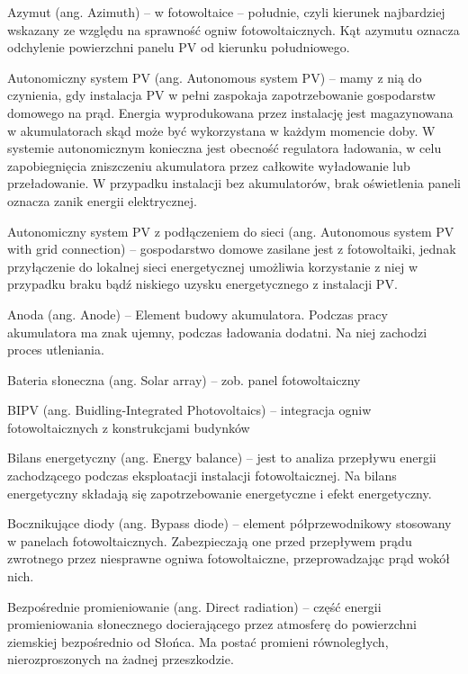 \documentclass[12pt,a4paper]{article}
\begin{document}
Azymut (ang. Azimuth) – w fotowoltaice – południe, czyli kierunek najbardziej wskazany ze względu na sprawność ogniw fotowoltaicznych. Kąt azymutu oznacza odchylenie powierzchni panelu PV od kierunku południowego.

Autonomiczny system PV (ang. Autonomous system PV) – mamy z nią do czynienia, gdy instalacja PV w pełni zaspokaja zapotrzebowanie gospodarstw domowego na prąd. Energia wyprodukowana przez instalację jest magazynowana w akumulatorach skąd może być wykorzystana w każdym momencie doby. W systemie autonomicznym konieczna jest obecność regulatora ładowania, w celu zapobiegnięcia zniszczeniu akumulatora przez całkowite wyładowanie lub przeładowanie. W przypadku instalacji bez akumulatorów, brak oświetlenia paneli oznacza zanik energii elektrycznej.

Autonomiczny system PV z podłączeniem do sieci (ang. Autonomous system PV with grid connection) – gospodarstwo domowe zasilane jest z fotowoltaiki, jednak przyłączenie do lokalnej sieci energetycznej umożliwia korzystanie z niej w przypadku braku bądź niskiego uzysku energetycznego z instalacji PV.

Anoda (ang. Anode) – Element budowy akumulatora. Podczas pracy akumulatora ma znak ujemny, podczas ładowania dodatni. Na niej zachodzi proces utleniania.


Bateria słoneczna (ang. Solar array) – zob. panel fotowoltaiczny

BIPV (ang. Buidling-Integrated Photovoltaics) – integracja ogniw fotowoltaicznych z konstrukcjami budynków

Bilans energetyczny (ang. Energy balance) – jest to analiza przepływu energii zachodzącego podczas eksploatacji instalacji fotowoltaicznej.  Na bilans energetyczny składają się zapotrzebowanie energetyczne i efekt energetyczny.

Bocznikujące diody (ang. Bypass diode) – element półprzewodnikowy stosowany w panelach fotowoltaicznych. Zabezpieczają one przed przepływem prądu zwrotnego przez niesprawne ogniwa fotowoltaiczne, przeprowadzając prąd wokół nich.

Bezpośrednie promieniowanie (ang. Direct radiation) – część energii promieniowania słonecznego docierającego przez atmosferę do powierzchni ziemskiej bezpośrednio od Słońca. Ma postać promieni równoległych, nierozproszonych na żadnej przeszkodzie.
\end{document}
